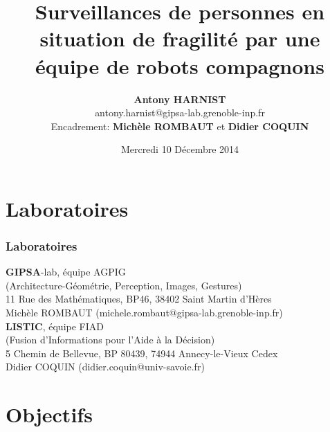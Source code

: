 \documentclass[usepdftitle=false, xcolor=dvipsnames, 12, c]{beamer} %
\title[ARC6 : Robots compagnons]{\Large \textbf{Surveillances de personnes en situation de fragilité par une équipe de robots compagnons}}
\author[Antony Harnist]{\Large \textbf{Antony HARNIST}\\ \small antony.harnist@gipsa-lab.grenoble-inp.fr\\ \vspace{1cm}
Encadrement: \textbf{Michèle ROMBAUT} et \textbf{Didier COQUIN}}
\institute{\Large \textbf{GIPSA}\normalsize-lab et \Large \textbf{LISTIC} }
\date[10/12/2014]{Mercredi 10 Décembre 2014}
\let\otp\titlepage
\renewcommand{\titlepage}{\otp\addtocounter{framenumber}{-1}}
\begin{document}
\begin{frame}[plain, label=titre]   %
    \maketitle    %
\end{frame} 




\section{Laboratoires}
\begin{frame}[label=laboratoires]
    \frametitle{Laboratoires} %
    \textbf{GIPSA}-lab, équipe AGPIG \\
        (Architecture-Géométrie, Perception, Images, Gestures)\\
        11 Rue des Mathématiques, BP46, 38402 Saint Martin d’Hères\\
        Michèle ROMBAUT	\small(michele.rombaut@gipsa-lab.grenoble-inp.fr)\\
    \vspace{2em}
    \textbf{LISTIC}, équipe FIAD \\
        (Fusion d'Informations pour l'Aide à la Décision)\\
        5 Chemin de Bellevue, BP 80439, 74944 Annecy-le-Vieux Cedex\\
        Didier COQUIN	\small(didier.coquin@univ-savoie.fr)\\
\end{frame} 



\section{Objectifs}
\end{document}

